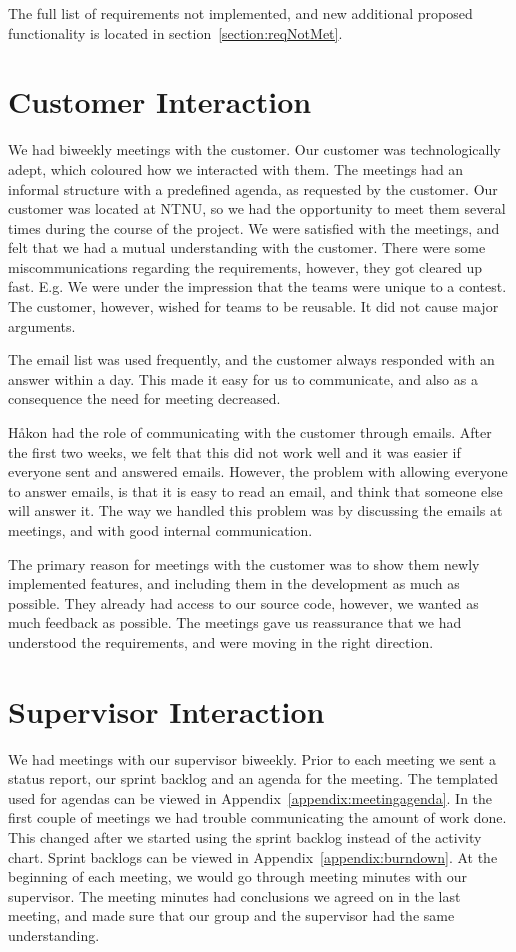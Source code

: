 The full list of requirements not implemented, and new additional
proposed functionality is located in section~\ref{section:reqNotMet}.




\section{Customer Interaction}

We had biweekly meetings with the customer. Our customer was
technologically adept, which coloured how we interacted with them. The
meetings had an informal structure with a predefined agenda, as
requested by the customer. Our customer was located at NTNU, so we had
the opportunity to meet them several times during the course of the
project. We were satisfied with the meetings, and felt that we had a
mutual understanding with the customer. There were some
miscommunications regarding the requirements, however, they got cleared
up fast. E.g. We were under the impression that the teams were unique
to a contest. The customer, however, wished for teams to be reusable.
It did not cause major arguments.

The email list was used frequently, and the customer always responded
with an answer within a day. This made it easy for us to communicate,
and also as a consequence the need for meeting decreased. 

H{\aa}kon had the role of communicating with the customer through emails.
After the first two weeks, we felt that this did not work well and it
was easier if everyone sent and answered emails. However, the problem
with allowing everyone to answer emails, is that it is easy to read an
email, and think that someone else will answer it. The way we handled
this problem was by discussing the emails at meetings, and with good
internal communication. 

The primary reason for meetings with the customer was to show them newly
implemented features, and including them in the development as much as
possible. They already had access to our source code, however, we
wanted as much feedback as possible. The meetings gave us reassurance
that we had understood the requirements, and were moving in the right
direction. 

\pagebreak
\section{Supervisor Interaction}

We had meetings with our supervisor biweekly. Prior to each meeting we
sent a status report, our sprint backlog and an agenda for the meeting.
The templated used for agendas can be viewed in Appendix~\ref{appendix:meetingagenda}. In the
first couple of meetings we had trouble communicating the amount of
work done. This changed after we started using the sprint backlog
instead of the activity chart. Sprint backlogs can be viewed in Appendix~\ref{appendix:burndown}. At
the beginning of each meeting, we would go through meeting minutes with
our supervisor. The meeting minutes had conclusions we agreed on in the
last meeting, and made sure that our group and the supervisor had the
same understanding. \ 

